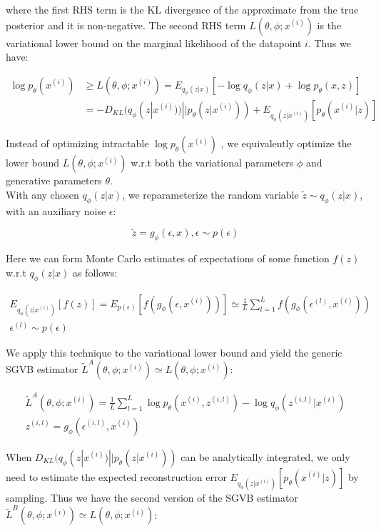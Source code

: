 \documentclass[11pt]{article}
\begin{document}
\noindent
where the first RHS term is the KL divergence of the approximate from the true posterior and it is non-negative. The second RHS term $L(\theta, \phi; x^{(i)})$ is the variational lower bound on the marginal likelihood of the datapoint $i$. Thus we have:

\begin{align}
\log p_\theta(x^{(i)}) &\geq L(\theta, \phi; x^{(i)})=E_{q_\phi(z|x)}[-\log q_\phi(z|x)+\log p_\theta(x,z)]\\
& =-D_{KL}(q_\phi(z|x^{(i)}))||p_\theta(z|x^{(i)}))+E_{q_\phi(z|x^{(i)})}[p_\theta(x^{(i)}|z)]
\end{align}

\vspace{3mm}
Instead of optimizing intractable $\log p_\theta(x^{(i)})$ , we equivalently optimize the lower bound $L(\theta, \phi; x^{(i)})$ w.r.t both the variational parameters $\phi$ and generative parameters $\theta$.\\

\noindent
With any chosen $q_\phi(z|x)$, we reparameterize the random variable $\widetilde{z}\sim q_\phi(z|x)$, with an auxiliary noise $\epsilon$:

\begin{equation}
\widetilde{z}=g_\phi(\epsilon, x), \epsilon\sim p(\epsilon)
\end{equation}

\noindent
Here we can form Monte Carlo estimates of expectations of some function $f(z)$ w.r.t $q_\phi(z|x)$ as follows:

\begin{eqnarray}
E_{q_\phi(z|x^{(i)})}[f(z)]=E_{p(\epsilon)}[f(g_\phi (\epsilon, x^{(i)}))]\simeq\frac{1}{L}\sum^L_{l=1}f(g_\phi (\epsilon^{(l)}, x^{(i)}))  \\
\epsilon^{(l)}\sim p(\epsilon)
\end{eqnarray}

We apply this technique to the variational lower bound and yield the generic SGVB estimator $\widetilde{L}^A(\theta, \phi; x^{(i)})\simeq L(\theta, \phi; x^{(i)})$:

\begin{eqnarray}
\widetilde{L}^A(\theta, \phi; x^{(i)})=\frac{1}{L}\sum^L_{l=1}\log p_\theta (x^{(i)}, z^{(i, l)})-\log q_\phi(z^{(i, l)}|x^{(i)})\\
z^{(i,l)}=g_\phi (\epsilon^{(i, l)}, x^{(i)})
\end{eqnarray}

\vspace{3mm}
When $D_{KL}(q_\phi(z|x^{(i)})||p_\theta(z|x^{(i)}))$ can be analytically integrated, we only need to estimate the expected reconstruction error $E_{q_\phi(z|x^{(i)})}[p_\theta(x^{(i)}|z)]$ by sampling. Thus we have the second version of the SGVB estimator $\widetilde{L}^B(\theta, \phi; x^{(i)})\simeq L(\theta, \phi; x^{(i)})$:
\end{document}
